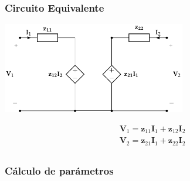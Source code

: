 \subsubsection{Circuito Equivalente}
\label{sec:org634cc26}
\begin{center}
\includegraphics[height=4cm]{../figs/circuitoEquivalenteZ.pdf}
\end{center}

\[
\begin{array}{l}
  \mathbf{V}_1 = \mathbf{z}_{11} \mathbf{I}_1 + \mathbf{z}_{12} \mathbf{I}_2\\
  \mathbf{V}_2 = \mathbf{z}_{21} \mathbf{I}_1 + \mathbf{z}_{22} \mathbf{I}_2\\
\end{array}
\]

\subsubsection{Cálculo de parámetros}
\label{sec:org74b4bb2}

